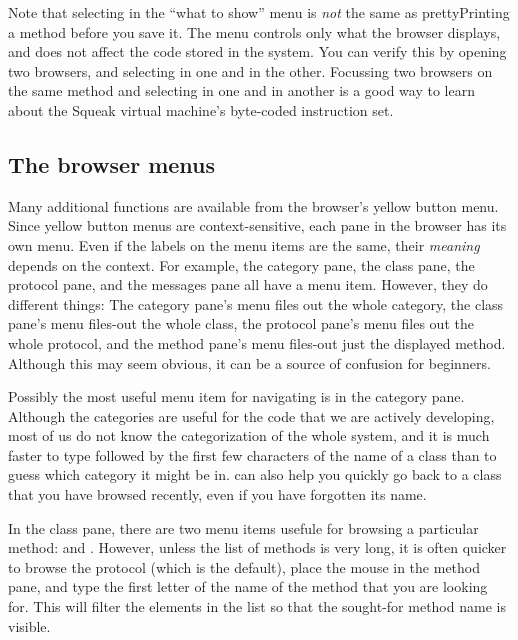 \documentclass[a4paper,10pt,twoside]{book}
\begin{document}
Note that selecting  in the ``what to show'' menu is \emph{not} the same as prettyPrinting a method before you save it.
The menu controls only what the browser displays, and does not affect the code stored in the system.
You can verify this by opening two browsers, and selecting  in one and  in the other.
Focussing two browsers on the same method and selecting  in one and  in another is a good way to learn about the Squeak virtual machine's byte-coded instruction set.

\subsection{The browser menus}

Many additional functions are available from the browser's yellow button menu.
Since yellow button menus are context-sensitive,  each pane in the browser has its own menu.
Even if the labels on the menu items are the same, their \emph{meaning} depends on the context.
For example, the category pane, the class pane, the protocol pane, and the messages pane all have a  menu item.
However, they do different things:
The category pane's  menu files out the whole category, the class pane's  menu files-out the whole class, the protocol pane's  menu files out the whole protocol, and the method pane's  menu files-out just the displayed method.
Although this may seem obvious, it can be a source of confusion for beginners.

Possibly the most useful menu item for navigating is  in the category pane.
Although the categories are useful for the code that we are actively developing, most of us do not know the categorization of the whole system, and it is much faster to type  followed by the first few characters of the name of a class than to guess which category it might be in.
 can also help you quickly go back to a class that you have browsed recently, even if you have forgotten its name.

In the class pane, there are two menu items usefule for browsing a particular method:  and .
However, unless the list of methods is very long, it is often quicker to browse the  protocol (which is the default), place the mouse in the method pane, and type the first letter of the name of the method that you are looking for.
This will filter the elements in the list so that the sought-for method name is visible.
\end{document}
